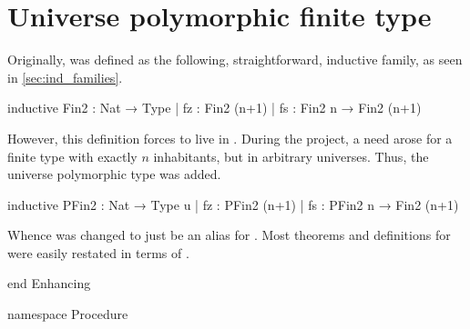 \section{Universe polymorphic finite type}%
\label{sec:enhance:pfin2}
Originally,  was defined as the following, straightforward, inductive family, as seen in \cref{sec:ind_families}.
\begin{leancode}
    inductive Fin2 : Nat → Type
    | fz : Fin2 (n+1)
    | fs : Fin2 n → Fin2 (n+1)
\end{leancode}

However, this definition forces  to live in \Type{}.
During the project, a need arose for a finite type with exactly $n$ inhabitants, but in arbitrary universes. Thus, the universe polymorphic  type was added.
\begin{leancode}
    inductive PFin2 : Nat → Type u
    | fz : PFin2 (n+1)
    | fs : PFin2 n → Fin2 (n+1)
\end{leancode}
Whence  was changed to just be an alias for .
Most theorems and definitions for  were easily restated in terms of .





\begin{leanhidden}
    end Enhancing

    namespace Procedure
\end{leanhidden}
